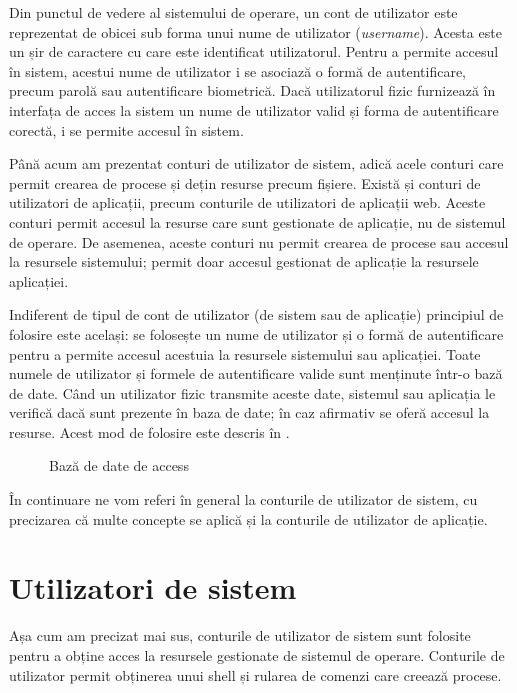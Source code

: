Din punctul de vedere al sistemului de operare, un cont de utilizator este reprezentat de obicei sub forma unui nume de utilizator (\textit{username}).
Acesta este un șir de caractere cu care este identificat utilizatorul.
Pentru a permite accesul în sistem, acestui nume de utilizator i se asociază o formă de autentificare, precum parolă sau autentificare biometrică.
Dacă utilizatorul fizic furnizează în interfața de acces la sistem un nume de utilizator valid și forma de autentificare corectă, i se permite accesul în sistem.

Până acum am prezentat conturi de utilizator de sistem, adică acele conturi care permit crearea de procese și dețin resurse precum fișiere.
Există și conturi de utilizatori de aplicații, precum conturile de utilizatori de aplicații web.
Aceste conturi permit accesul la resurse care sunt gestionate de aplicație, nu de sistemul de operare.
De asemenea, aceste conturi nu permit crearea de procese sau accesul la resursele sistemului;
permit doar accesul gestionat de aplicație la resursele aplicației.

Indiferent de tipul de cont de utilizator (de sistem sau de aplicație) principiul de folosire este același: se folosește un nume de utilizator și o formă de autentificare pentru a permite accesul acestuia la resursele sistemului sau aplicației.
Toate numele de utilizator și formele de autentificare valide sunt menținute într-o bază de date.
Când un utilizator fizic transmite aceste date, sistemul sau aplicația le verifică dacă sunt prezente în baza de date;
în caz afirmativ se oferă accesul la resurse.
Acest mod de folosire este descris în .

\begin{figure}[htbp]
  \centering
  \def\svgwidth{0.9\columnwidth}
  
  \caption{Bază de date de access}
  \label{fig:user:db-access}
\end{figure}

În continuare ne vom referi în general la conturile de utilizator de sistem, cu precizarea că multe concepte se aplică și la conturile de utilizator de aplicație.

\section{Utilizatori de sistem}
\label{sec:user:system-users}

Așa cum am precizat mai sus, conturile de utilizator de sistem sunt folosite pentru a obține acces la resursele gestionate de sistemul de operare.
Conturile de utilizator permit obținerea unui shell și rularea de comenzi care creează procese.

